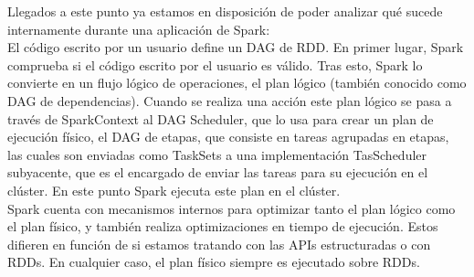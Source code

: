 Llegados a este punto ya estamos en disposición de poder analizar qué sucede internamente durante una aplicación de Spark:\\

El código escrito por un usuario define un DAG de RDD. En primer lugar, Spark comprueba si el código escrito por el usuario es válido. Tras esto, Spark lo convierte en un flujo lógico de operaciones, el plan lógico (también conocido como DAG de dependencias). Cuando se realiza una acción este plan lógico se pasa a través de SparkContext al DAG Scheduler, que lo usa para crear un plan de ejecución físico, el DAG de etapas, que consiste en tareas agrupadas en etapas, las cuales son enviadas como TaskSets a una implementación TasScheduler subyacente, que es el encargado de enviar las tareas para su ejecución en el clúster. En este punto Spark ejecuta este plan en el clúster.\\

Spark cuenta con mecanismos internos para optimizar tanto el plan lógico como el plan físico, y también realiza optimizaciones en tiempo de ejecución. Estos difieren en función de si estamos tratando con las APIs estructuradas o con RDDs. En cualquier caso, el plan físico siempre es ejecutado sobre RDDs.
